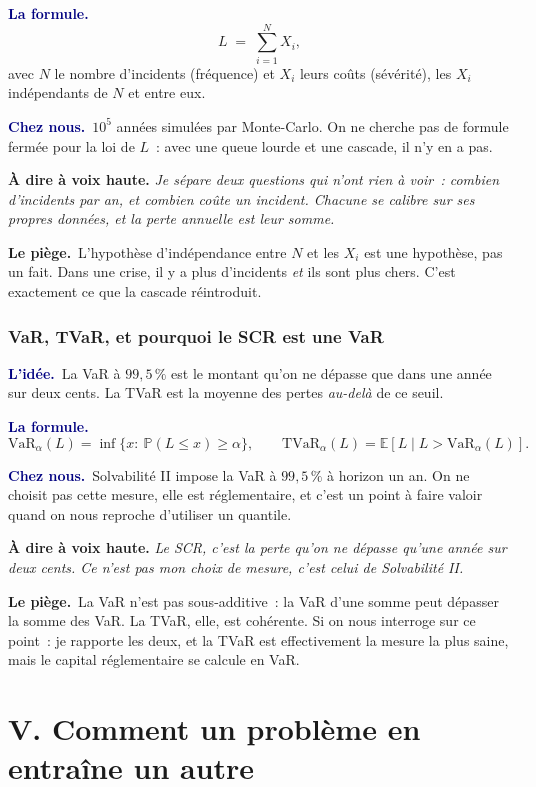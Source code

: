 \documentclass[11pt,a4paper]{article}
\newcommand{\lidee}[1]{\smallskip\noindent\textcolor{navy}{\textbf{L'idée.}}\ #1\par}
\newcommand{\laformule}[1]{\smallskip\noindent\textcolor{navy}{\textbf{La formule.}}\ #1\par}
\newcommand{\cheznous}[1]{\smallskip\noindent\textcolor{navy}{\textbf{Chez nous.}}\ #1\par}
\newcommand{\lepiege}[1]{\smallskip\noindent\textcolor{accent}{\textbf{Le piège.}}\ #1\par}
\newcommand{\laphrase}[1]{\begin{phrasebox}\textbf{À dire à voix haute.} \emph{#1}\end{phrasebox}}
\begin{document}
\laformule{
\[
  L \;=\; \sum_{i=1}^{N} X_i,
\]
avec $N$ le nombre d'incidents (fréquence) et $X_i$ leurs coûts (sévérité), les $X_i$
indépendants de $N$ et entre eux.}

\cheznous{$10^5$ années simulées par Monte-Carlo. On ne cherche pas de formule fermée pour
la loi de $L$~: avec une queue lourde et une cascade, il n'y en a pas.}

\laphrase{Je sépare deux questions qui n'ont rien à voir~: combien d'incidents par an, et
combien coûte un incident. Chacune se calibre sur ses propres données, et la perte annuelle
est leur somme.}

\lepiege{L'hypothèse d'indépendance entre $N$ et les $X_i$ est une hypothèse, pas un fait.
Dans une crise, il y a plus d'incidents \emph{et} ils sont plus chers. C'est exactement ce
que la cascade réintroduit.}

\section{VaR, TVaR, et pourquoi le SCR est une VaR}

\lidee{La VaR à $99{,}5\,\%$ est le montant qu'on ne dépasse que dans une année sur deux
cents. La TVaR est la moyenne des pertes \emph{au-delà} de ce seuil.}

\laformule{
\[
  \mathrm{VaR}_\alpha(L)=\inf\{x:\ \mathbb{P}(L\le x)\ge\alpha\},
  \qquad
  \mathrm{TVaR}_\alpha(L)=\mathbb{E}[L\mid L>\mathrm{VaR}_\alpha(L)].
\]}

\cheznous{Solvabilité II impose la VaR à $99{,}5\,\%$ à horizon un an. On ne choisit pas
cette mesure, elle est réglementaire, et c'est un point à faire valoir quand on nous
reproche d'utiliser un quantile.}

\laphrase{Le SCR, c'est la perte qu'on ne dépasse qu'une année sur deux cents. Ce n'est pas
mon choix de mesure, c'est celui de Solvabilité II.}

\lepiege{La VaR n'est pas sous-additive~: la VaR d'une somme peut dépasser la somme des VaR.
La TVaR, elle, est cohérente. Si on nous interroge sur ce point~: \og je rapporte les deux, et
la TVaR est effectivement la mesure la plus saine, mais le capital réglementaire se calcule
en VaR\fg{}.}

\part*{V. Comment un problème en entraîne un autre}
\end{document}
